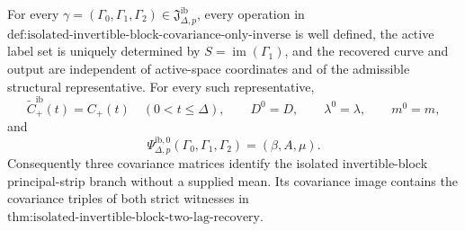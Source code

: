 For every \(\gamma=(\Gamma_0,\Gamma_1,\Gamma_2)\in\mathfrak J_{\Delta,p}^{\mathrm{ib}}\), every operation in \(\text{def:isolated-invertible-block-covariance-only-inverse}\) is well defined, the active label set is uniquely determined by \(S=\operatorname{im}(\Gamma_1)\), and the recovered curve and output are independent of active-space coordinates and of the admissible structural representative.  For every such representative,
\[
 \widetilde C_{+}^{\mathrm{ib}}(t)=C_{+}(t)\quad(0<t\leq\Delta),\qquad
 D^0=D,\qquad \lambda^0=\lambda,\qquad m^0=m,
\]
and
\[
 \Psi_{\Delta,p}^{\mathrm{ib},0}(\Gamma_0,\Gamma_1,\Gamma_2)=(\beta,A,\mu).
\]
Consequently three covariance matrices identify the isolated invertible-block principal-strip branch without a supplied mean.  Its covariance image contains the covariance triples of both strict witnesses in \(\text{thm:isolated-invertible-block-two-lag-recovery}\).